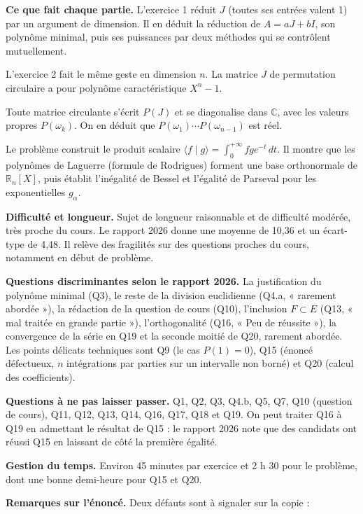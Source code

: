 \documentclass[11pt,a4paper]{article}
\begin{document}
\textbf{Ce que fait chaque partie.} L'exercice 1 réduit \(J\) (toutes ses entrées valent 1) par un argument de dimension. Il en déduit la réduction de \(A=aJ+bI\), son polynôme minimal, puis ses puissances par deux méthodes qui se contrôlent mutuellement.

L'exercice 2 fait le même geste en dimension \(n\). La matrice \(J\) de permutation circulaire a pour polynôme caractéristique \(X^n-1\).

Toute matrice circulante s'écrit \(P(J)\) et se diagonalise dans \(\mathbb C\), avec les valeurs propres \(P(\omega_k)\). On en déduit que \(P(\omega_1)\cdots P(\omega_{n-1})\) est réel.

Le problème construit le produit scalaire \(\langle f\mid g\rangle=\int_0^{+\infty}fge^{-t}\,dt\). Il montre que les polynômes de Laguerre (formule de Rodrigues) forment une base orthonormale de \(\mathbb R_n[X]\), puis établit l'inégalité de Bessel et l'égalité de Parseval pour les exponentielles \(g_\alpha\).

\textbf{Difficulté et longueur.} Sujet de longueur raisonnable et de difficulté modérée, très proche du cours. Le rapport 2026 donne une moyenne de 10,36 et un écart-type de 4,48. Il relève des fragilités sur des questions proches du cours, notamment en début de problème.

\textbf{Questions discriminantes selon le rapport 2026.} La justification du polynôme minimal (Q3), le reste de la division euclidienne (Q4.a, « rarement abordée »), la rédaction de la question de cours (Q10), l'inclusion \(F\subset E\) (Q13, « mal traitée en grande partie »), l'orthogonalité (Q16, « Peu de réussite »), la convergence de la série en Q19 et la seconde moitié de Q20, rarement abordée. Les points délicats techniques sont Q9 (le cas \(P(1)=0\)), Q15 (énoncé défectueux, \(n\) intégrations par parties sur un intervalle non borné) et Q20 (calcul des coefficients).

\textbf{Questions à ne pas laisser passer.} Q1, Q2, Q3, Q4.b, Q5, Q7, Q10 (question de cours), Q11, Q12, Q13, Q14, Q16, Q17, Q18 et Q19. On peut traiter Q16 à Q19 en admettant le résultat de Q15 : le rapport 2026 note que des candidats ont réussi Q15 en laissant de côté la première égalité.

\textbf{Gestion du temps.} Environ 45 minutes par exercice et 2 h 30 pour le problème, dont une bonne demi-heure pour Q15 et Q20.

\textbf{Remarques sur l'énoncé.} Deux défauts sont à signaler sur la copie :
\end{document}
